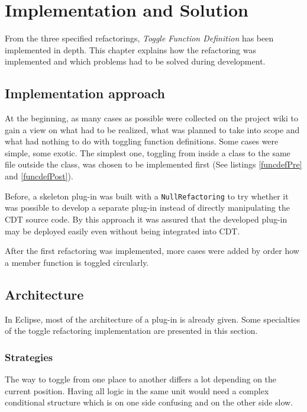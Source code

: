\chapter{Implementation and Solution}
\thispagestyle{fancy}

From the three specified refactorings, \textit{Toggle Function Definition} has 
been implemented in depth. This chapter explains how the refactoring was 
implemented and which problems had to be solved during development.

\section{Implementation approach}

At the beginning, as many cases as possible were collected on the project wiki 
to gain a view on what had to be realized, what was planned to take into scope 
and what had nothing to do with toggling function definitions. Some cases were 
simple, some exotic. The simplest one, toggling from inside a class to the same 
file outside the class, was chosen to be implemented first (See listings 
\ref{funcdefPre} and \ref{funcdefPost}). 

Before, a skeleton plug-in was built with a \texttt{NullRefactoring} to try
whether it was possible to develop a separate plug-in instead of directly
manipulating the CDT source code. By this approach it was assured that the
developed plug-in may be deployed easily even without being integrated into CDT.

After the first refactoring was implemented, more cases were added by order how
a member function is toggled circularly.

\section{Architecture}

In Eclipse, most of the architecture of a plug-in is already given. Some
specialties of the toggle refactoring implementation are presented in this
section.

\subsection{Strategies}

The way to toggle from one place to another differs a lot depending on
the current position. Having all logic in the same unit would need a complex
conditional structure which is on one side confusing and on the other side
slow.

